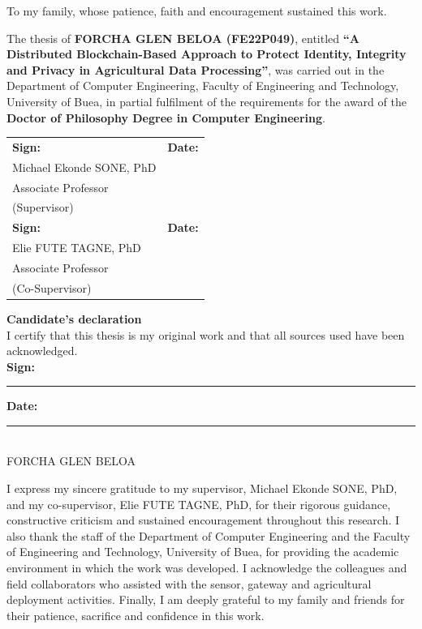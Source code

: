 \documentclass[12pt,a4paper,oneside]{book}
\begin{document}
\setcounter{page}{2}                     

\vspace{2\baselineskip}
\begin{center}
To my family, whose patience, faith and encouragement sustained this work.
\end{center}
\clearpage
\begin{singlespace}
\vspace{1.2\baselineskip}
The thesis of \textbf{FORCHA GLEN BELOA (FE22P049)}, entitled
\textbf{``A Distributed Blockchain-Based Approach to Protect Identity,
Integrity and Privacy in Agricultural Data Processing''}, was carried out in
the Department of Computer Engineering, Faculty of Engineering and Technology,
University of Buea, in partial fulfilment of the requirements for the award of
the \textbf{Doctor of Philosophy Degree in Computer Engineering}.

\vspace{2.2\baselineskip}
\noindent\begin{tabularx}{\textwidth}{@{}X X@{}}
\textbf{Sign:} \hrulefill & \textbf{Date:} \hrulefill \\[0.5\baselineskip]
Michael Ekonde SONE, PhD & \\
Associate Professor & \\
(Supervisor) & \\[1.5\baselineskip]
\textbf{Sign:} \hrulefill & \textbf{Date:} \hrulefill \\[0.5\baselineskip]
Elie FUTE TAGNE, PhD & \\
Associate Professor & \\
(Co-Supervisor) &
\end{tabularx}

\vfill
\begin{center}
\textbf{Candidate's declaration}\\[0.8\baselineskip]
I certify that this thesis is my original work and that all sources used have
been acknowledged.\\[1.5\baselineskip]
\textbf{Sign:} \rule{5cm}{0.4pt}\hspace{1cm}
\textbf{Date:} \rule{4cm}{0.4pt}\\[0.5\baselineskip]
FORCHA GLEN BELOA
\end{center}
\end{singlespace}
\clearpage

I express my sincere gratitude to my supervisor, Michael Ekonde SONE, PhD,
and my co-supervisor, Elie FUTE TAGNE, PhD, for their rigorous guidance,
constructive criticism and sustained encouragement throughout this research.
I also thank the staff of the Department of Computer Engineering and the
Faculty of Engineering and Technology, University of Buea, for providing the
academic environment in which the work was developed. I acknowledge the
colleagues and field collaborators who assisted with the sensor, gateway and
agricultural deployment activities. Finally, I am deeply grateful to my family
and friends for their patience, sacrifice and confidence in this work.
\end{document}
